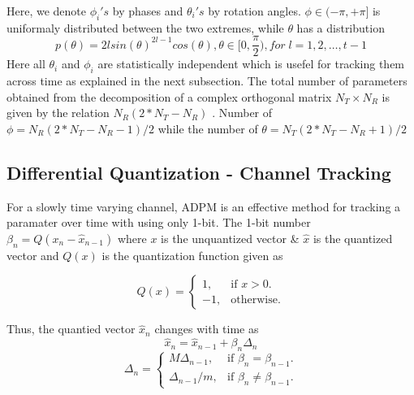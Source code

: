 \documentclass[conference]{IEEEtran}
\begin{document}
Here, we denote $\phi_{i}'s$ by phases and $\theta_{i}'s$ by rotation angles. $\phi \in (-\pi, + \pi]$ is uniformaly distributed between the two extremes\cite{4114278}, while $\theta$ has a distribution
\begin{equation}
p(\theta) = 2lsin(\theta)^{2l-1}cos(\theta), \theta \in [0, \frac{\pi}{2}), for \; l = 1,2,\ldots,t-1
\end{equation} 
Here all $\theta_i$ and $\phi_i$ are statistically independent which is usefel for tracking them across time as explained in the next subsection. The total number of parameters obtained from the decomposition of a complex orthogonal matrix $N_{T} \times N_{R} $ is given by the relation $N_{R}(2*N_{T} - N_{R}) $ \cite{4114278}. Number of $\phi = N_{R}(2*N_{T} - N_{R}-1)/2$ while the number of $\theta = N_{T}(2*N_{T} - N_{R}+1)/2$

\subsection{Differential Quantization - Channel Tracking}
\label{quantiz}
For a slowly time varying channel, ADPM is an effective method for tracking a paramater over time with using only 1-bit. The 1-bit number $\beta_{n} = Q(x_{n} - \hat{x}_{n-1})$ where $x$ is the unquantized vector \& $\hat{x}$ is the quantized vector and $Q(x)$ is the quantization function given as

\begin{equation}
  Q(x)=\begin{cases}
    1, & \text{if $x>0$}.\\
    -1, & \text{otherwise}.
  \end{cases}
\end{equation}

Thus, the quantied vector $\hat{x}_n$ changes with time as 
\begin{equation}
\hat{x}_{n} = \hat{x}_{n-1} + \beta_{n}\Delta_{n}
\end{equation}
\begin{equation}
\Delta_{n} = \begin{cases}
    M \Delta_{n-1}, & \text{if $\beta_{n} = \beta_{n-1}$}.\\
    \Delta_{n-1}/m , & \text{if $\beta_{n} \neq \beta_{n-1}$}.
  \end{cases}
\end{equation}
\end{document}
